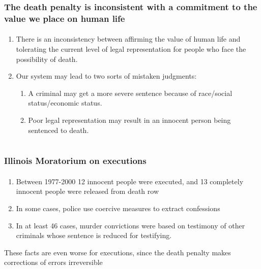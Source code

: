 \documentclass{beamer}
\begin{document}
\begin{frame}
    \frametitle{The death penalty is inconsistent with a commitment to 
the value we place on human life}
    \framesubtitle{}
\begin{enumerate}
\item There is an inconsistency between affirming the value of human 
life and tolerating the current level of legal representation for 
people who 
face the possibility of death.
\item Our system may lead to two sorts of mistaken judgments:
\begin{enumerate}
\item A criminal may get a more severe sentence because of race/social 
status/economic status.
\item Poor legal representation may result in an innocent person being 
sentenced to death.




\end{enumerate}
\end{enumerate}



\end{frame}


\section{}

\begin{frame}
    \frametitle{Illinois Moratorium on executions}
    \framesubtitle{}
\begin{enumerate}
\item Between 1977-2000 12 innocent people were executed, and 13 
completely innocent people 
were released from death row
\item In some cases, police use coercive measures to extract confessions
\item In at least 46 cases, murder convictions were based on testimony 
of other criminals whose sentence is reduced for testifying.


\end{enumerate}
These facts are even worse for executions, since the death penalty makes 
corrections of errors irreversible


\end{frame}


\section{}
\end{document}

